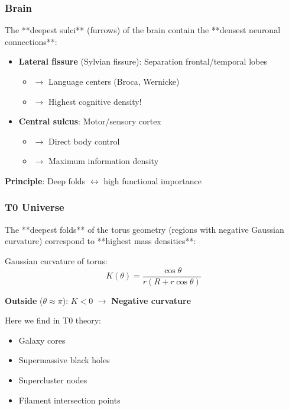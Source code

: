 	\subsubsection{Brain}
	
	The **deepest sulci** (furrows) of the brain contain the **densest neuronal connections**:
	
	\begin{itemize}
		\item \textbf{Lateral fissure} (Sylvian fissure): Separation frontal/temporal lobes
		\begin{itemize}
			\item $\to$ Language centers (Broca, Wernicke)
			\item $\to$ Highest cognitive density!
		\end{itemize}
		\item \textbf{Central sulcus}: Motor/sensory cortex
		\begin{itemize}
			\item $\to$ Direct body control
			\item $\to$ Maximum information density
		\end{itemize}
	\end{itemize}
	
	\textbf{Principle}: Deep folds $\leftrightarrow$ high functional importance
	
	\subsubsection{T0 Universe}
	
	The **deepest folds** of the torus geometry (regions with negative Gaussian curvature) correspond to **highest mass densities**:
	
	Gaussian curvature of torus:
	\begin{equation}
		K(\theta) = \frac{\cos\theta}{r(R + r\cos\theta)}
	\end{equation}
	
	\textbf{Outside} ($\theta \approx \pi$): $K < 0$ $\to$ \textbf{Negative curvature}
	
	Here we find in T0 theory:
	\begin{itemize}
		\item Galaxy cores
		\item Supermassive black holes
		\item Supercluster nodes
		\item Filament intersection points
	\end{itemize}
	
